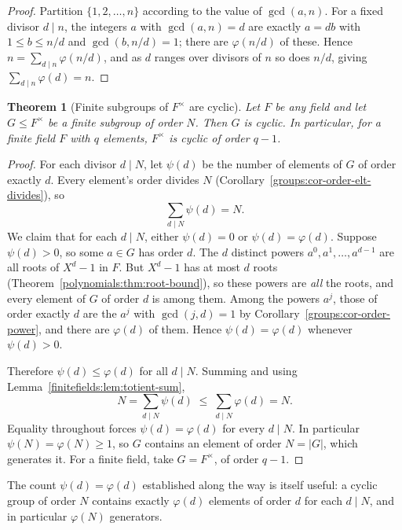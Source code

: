 \documentclass[11pt,a4paper]{article}
\newtheorem{theorem}{Theorem}[section]
\theoremstyle{definition}
\theoremstyle{remark}
\begin{document}
\begin{proof}
Partition \(\{1,2,\dots,n\}\) according to the value of \(\gcd(a,n)\). For a fixed divisor \(d \mid n\), the integers \(a\) with \(\gcd(a,n)=d\) are exactly \(a = d b\) with \(1 \le b \le n/d\) and \(\gcd(b, n/d)=1\); there are \(\varphi(n/d)\) of these. Hence \(n = \sum_{d \mid n}\varphi(n/d)\), and as \(d\) ranges over divisors of \(n\) so does \(n/d\), giving \(\sum_{d \mid n}\varphi(d)=n\).
\end{proof}

\begin{theorem}[Finite subgroups of \(F^\times\) are cyclic]
\label{finitefields:thm:cyclic}
Let \(F\) be any field and let \(G \le F^\times\) be a finite subgroup of order \(N\). Then \(G\) is cyclic. In particular, for a finite field \(F\) with \(q\) elements, \(F^\times\) is cyclic of order \(q-1\).
\end{theorem}

\begin{proof}
For each divisor \(d \mid N\), let \(\psi(d)\) be the number of elements of \(G\) of order exactly \(d\). Every element's order divides \(N\) (Corollary~\ref{groups:cor-order-elt-divides}), so
\[
\sum_{d \mid N} \psi(d) = N.
\]
We claim that for each \(d \mid N\), either \(\psi(d) = 0\) or \(\psi(d) = \varphi(d)\). Suppose \(\psi(d) > 0\), so some \(a \in G\) has order \(d\). The \(d\) distinct powers \(a^0, a^1, \dots, a^{d-1}\) are all roots of \(X^d - 1\) in \(F\). But \(X^d - 1\) has at most \(d\) roots (Theorem~\ref{polynomials:thm:root-bound}), so these powers are \emph{all} the roots, and every element of \(G\) of order \(d\) is among them. Among the powers \(a^j\), those of order exactly \(d\) are the \(a^j\) with \(\gcd(j,d)=1\) by Corollary~\ref{groups:cor-order-power}, and there are \(\varphi(d)\) of them. Hence \(\psi(d) = \varphi(d)\) whenever \(\psi(d)>0\).

Therefore \(\psi(d) \le \varphi(d)\) for all \(d \mid N\). Summing and using Lemma~\ref{finitefields:lem:totient-sum},
\[
N = \sum_{d \mid N}\psi(d) \;\le\; \sum_{d \mid N}\varphi(d) = N.
\]
Equality throughout forces \(\psi(d) = \varphi(d)\) for every \(d \mid N\). In particular \(\psi(N) = \varphi(N) \ge 1\), so \(G\) contains an element of order \(N = |G|\), which generates it. For a finite field, take \(G = F^\times\), of order \(q-1\).
\end{proof}

The count \(\psi(d) = \varphi(d)\) established along the way is itself useful: a cyclic group of order \(N\) contains exactly \(\varphi(d)\) elements of order \(d\) for each \(d \mid N\), and in particular \(\varphi(N)\) generators.
\end{document}
